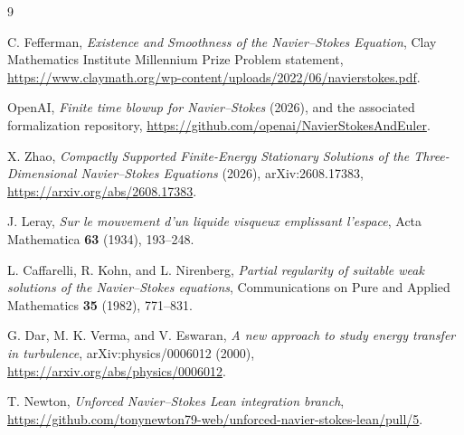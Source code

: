 \documentclass[11pt,a4paper]{article}
\theoremstyle{plain}
\theoremstyle{definition}
\begin{document}
\begin{thebibliography}{9}
\raggedright
\small
{}
C. Fefferman, \emph{Existence and Smoothness of the Navier--Stokes
Equation}, Clay Mathematics Institute Millennium Prize Problem
statement, \url{https://www.claymath.org/wp-content/uploads/2022/06/navierstokes.pdf}.

OpenAI, \emph{Finite time blowup for Navier--Stokes} (2026), and the
associated formalization repository,
\url{https://github.com/openai/NavierStokesAndEuler}.

X. Zhao, \emph{Compactly Supported Finite-Energy Stationary Solutions of
the Three-Dimensional Navier--Stokes Equations} (2026),
arXiv:2608.17383, \url{https://arxiv.org/abs/2608.17383}.

J. Leray, \emph{Sur le mouvement d'un liquide visqueux emplissant
l'espace}, Acta Mathematica \textbf{63} (1934), 193--248.

L. Caffarelli, R. Kohn, and L. Nirenberg, \emph{Partial regularity
of suitable weak solutions of the Navier--Stokes equations},
Communications on Pure and Applied Mathematics \textbf{35} (1982),
771--831.

G. Dar, M. K. Verma, and V. Eswaran,
\emph{A new approach to study energy transfer in turbulence},
arXiv:physics/0006012 (2000),
\url{https://arxiv.org/abs/physics/0006012}.

T. Newton, \emph{Unforced Navier--Stokes Lean integration branch},
\url{https://github.com/tonynewton79-web/unforced-navier-stokes-lean/pull/5}.
\end{thebibliography}
\end{document}
